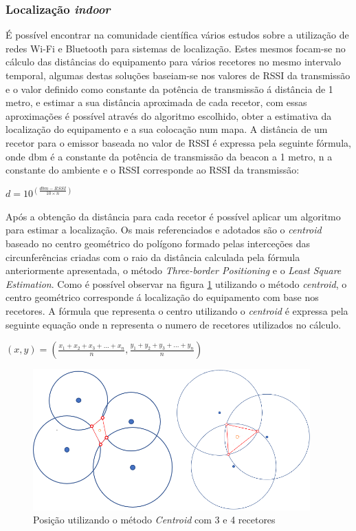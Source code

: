 \subsubsection{Localização \textit{indoor}} \label{indoor}
\par
É possível encontrar na comunidade científica vários estudos sobre a utilização de redes Wi-Fi e Bluetooth para sistemas de localização. Estes mesmos focam-se no cálculo das distâncias do equipamento para vários recetores no mesmo intervalo temporal, algumas destas soluções baseiam-se nos valores de RSSI da transmissão e o valor definido como constante da potência de transmissão á distância de 1 metro, e estimar a sua distância aproximada de cada recetor, com essas aproximações é possível através do algoritmo escolhido\cite{Wang2013}, obter a estimativa da localização do equipamento e a sua colocação num mapa.
A distância de um recetor para o emissor baseada no valor de RSSI é expressa pela seguinte fórmula, onde dbm é a constante da potência de transmissão da beacon a 1 metro, n a constante do ambiente e o RSSI corresponde ao RSSI da transmissão:
\par
\begin{center}
$d=10^(\frac{dbm-RSSI}{10 \times n})$
\end{center}

\par
Após a obtenção da distância para cada recetor é possível aplicar um algoritmo para estimar a localização. Os mais referenciados e adotados são o \textit{centroid} baseado no centro geométrico do polígono formado pelas interceções das circunferências criadas com o raio da distância calculada pela fórmula anteriormente apresentada, o método \textit{Three-border Positioning} e o \textit{Least Square Estimation}.
Como é possível observar na figura \ref{centroid} utilizando o método \textit{centroid}, o centro geométrico corresponde á localização do equipamento com base nos recetores. A fórmula que representa o centro utilizando o \textit{centroid} é expressa pela seguinte equação onde n representa o numero de recetores utilizados no cálculo.
\par
\begin{center}
$ (x,y)= (\frac{x_{1}+x_{2}+x_{3}+...+x_{n}}{n},\frac{y_{1}+y_{2}+y_{3}+...+y_{n}}{n})$
\end{center}

\begin{figure}[htb]
\centering
\includegraphics[width=0.95\textwidth]{images/centroid3.png}
\caption{Posição utilizando o método \textit{Centroid} com 3 e 4 recetores}\label{centroid}
\end{figure}

